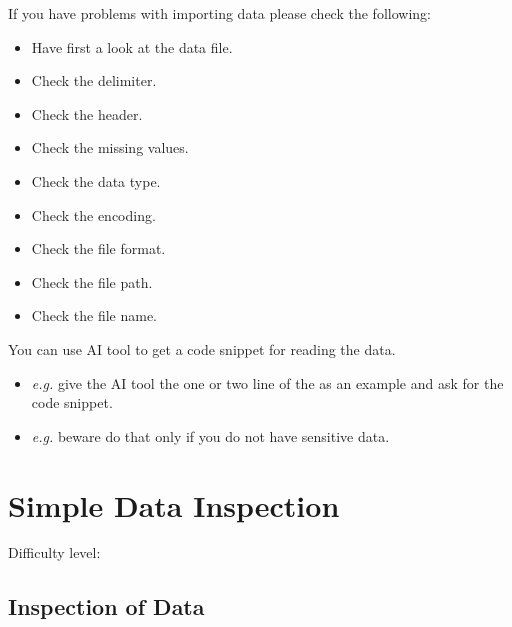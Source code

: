 \documentclass[
  letterpaper,
  DIV=11,
  numbers=noendperiod]{scrreprt}
\providecommand{\tightlist}{%
  \setlength{\itemsep}{0pt}\setlength{\parskip}{0pt}}\usepackage{longtable,booktabs,array}
\begin{document}
\begin{tcolorbox}[enhanced jigsaw, leftrule=.75mm, bottomrule=.15mm, colbacktitle=quarto-callout-important-color!10!white, title=\textcolor{quarto-callout-important-color}{\faExclamation}\hspace{0.5em}{Problems}, breakable, arc=.35mm, toptitle=1mm, opacityback=0, titlerule=0mm, coltitle=black, colback=white, opacitybacktitle=0.6, colframe=quarto-callout-important-color-frame, left=2mm, rightrule=.15mm, toprule=.15mm, bottomtitle=1mm]

If you have problems with importing data please check the following:

\begin{itemize}
\tightlist
\item
  Have first a look at the data file.
\item
  Check the delimiter.
\item
  Check the header.
\item
  Check the missing values.
\item
  Check the data type.
\item
  Check the encoding.
\item
  Check the file format.
\item
  Check the file path.
\item
  Check the file name.
\end{itemize}

You can use AI tool to get a code snippet for reading the data.

\begin{itemize}
\tightlist
\item
  \emph{e.g.} give the AI tool the one or two line of the as an example
  and ask for the code snippet.
\item
  \emph{e.g.} beware do that only if you do not have sensitive data.
\end{itemize}

\end{tcolorbox}

\chapter{Simple Data Inspection}\label{simple-data-inspection}

Difficulty level: { }

\section*{Inspection of Data}\label{inspection-of-data}
\end{document}
